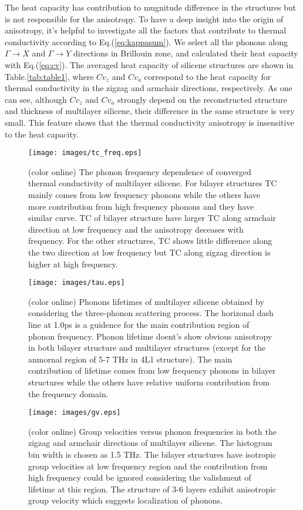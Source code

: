 \documentclass[aps,prb,twocolumn,showpacs,amsmath,amssymb]{revtex4-1}
\begin{document}
The heat capacity has contribution to mugnitude difference in the structures but is not responsible for the anisotropy. To have a deep insight into the origin of anisotropy, it's helpful to investigate all the factors that contribute to thermal conductivity according to Eq.(\ref{eq:kappasum}).
We select all the phonons along  $\Gamma\rightarrow X$ and $\Gamma \rightarrow Y$ directions in Brillouin zone, and calculated their heat capacity with Eq.(\ref{eq:cv}). The averaged heat capacity of silicene structures are shown in Table.\ref{tab:table1}, where $Cv_z$ and $Cv_a$ correspond to the  heat capacity for thermal conductivity in the zigzag and armchair directions, respectively.  As one can see, although $Cv_z$ and $Cv_a$  strongly depend on the reconstructed structure and thickness of multilayer silicene, their difference in the same structure is very small. This feature shows that the thermal conductivity anisotropy is insensitive to the heat capacity.


\begin{figure}[b]
  \texttt{[image: images/tc\_freq.eps]}
  \caption{\label{fig:tc_freq} (color online)  The phonon frequency dependence of converged thermal conductivity of multilayer silicene. For bilayer structures TC mainly comes from low frequency phonons while the others have more contribution from high frequency phonons and they have similar curve. TC of bilayer structure have larger TC along armchair direction at low frequency and the anisotropy deceases with frequency. For the other structures, TC shows little difference along the two direction at low frequency but TC along zigzag direction is higher at high frequency. }
\end{figure}

\begin{figure}[b]
  \texttt{[image: images/tau.eps]}
  \caption{\label{fig:tau} (color online)  Phonons lifetimes of multilayer silicene obtained by considering the three-phonon scattering process.  The horizonal dash line at 1.0ps is a guidence for the main contribution region of phonon frequency. Phonon lifetime doent's show obvious anisotropy in both bilayer structure and multilayer structures (except for the anmornal region of 5-7 THz in 4L1 structure). The main contribution of lifetime comes from low frequency phonons in bilayer structures while the others have relative uniform contribution from the frequency domain.  }
\end{figure}

\begin{figure}[b]
  \texttt{[image: images/gv.eps]}{}
  \caption{\label{fig:gv} (color online) Group velocities versus phonon frequencies in both the zigzag and armchair directions of multilayer silicene. The histogram bin width is chosen as 1.5 THz. The bilayer structures have isotropic group velocities at low frequency region and the contribution from high frequency could be ignored considering the valishment of lifetime at this region. The structure of 3-6 layers exhibit anisotropic group velocity which suggests localization of phonons.}
\end{figure}
\end{document}
